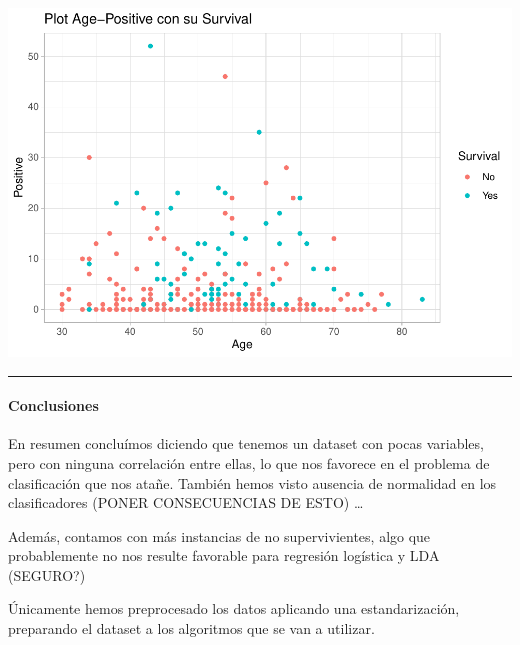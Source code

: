 \documentclass[
]{article}
\newenvironment{Shaded}{\begin{snugshade}}{\end{snugshade}}
\newcommand{\DataTypeTok}[1]{\textcolor[rgb]{0.13,0.29,0.53}{#1}}
\newcommand{\KeywordTok}[1]{\textcolor[rgb]{0.13,0.29,0.53}{\textbf{#1}}}
\newcommand{\NormalTok}[1]{#1}
\newcommand{\OperatorTok}[1]{\textcolor[rgb]{0.81,0.36,0.00}{\textbf{#1}}}
\newcommand{\StringTok}[1]{\textcolor[rgb]{0.31,0.60,0.02}{#1}}
\begin{document}
\begin{Shaded}
\end{Shaded}

\begin{center}\includegraphics{EDA2_files/figure-latex/unnamed-chunk-37-1} \end{center}

\begin{center}\rule{0.5\linewidth}{0.5pt}\end{center}

\hypertarget{conclusiones}{%
\paragraph{Conclusiones}\label{conclusiones}}

En resumen concluímos diciendo que tenemos un dataset con pocas
variables, pero con ninguna correlación entre ellas, lo que nos favorece
en el problema de clasificación que nos atañe. También hemos visto
ausencia de normalidad en los clasificadores (PONER CONSECUENCIAS DE
ESTO) \ldots{}

Además, contamos con más instancias de no supervivientes, algo que
probablemente no nos resulte favorable para regresión logística y LDA
(SEGURO?)

Únicamente hemos preprocesado los datos aplicando una estandarización,
preparando el dataset a los algoritmos que se van a utilizar.
\end{document}
